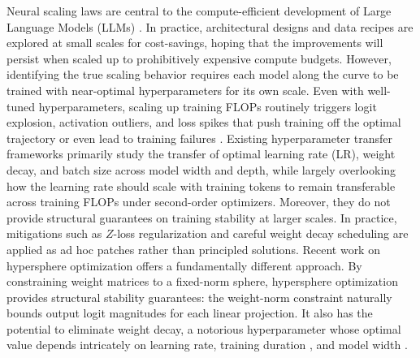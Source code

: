\documentclass{article}
\begin{document}
Neural scaling laws \cite{kaplan2020scaling, chinchilla, team2025every} are central to the compute-efficient development of Large Language Models (LLMs) \cite{gpt2, gpt3,openai2023gpt4, comanici2025gemini,deepseek-ai2024deepseekv3,team2025kimi,yang2025qwen3}. In practice, architectural designs and data recipes are explored at small scales for cost-savings, hoping that the improvements will persist when scaled up to prohibitively expensive compute budgets. However, identifying the true scaling behavior requires each model along the curve to be trained with near-optimal hyperparameters for its own scale. Even with well-tuned hyperparameters, scaling up training FLOPs routinely triggers logit explosion, activation outliers, and loss spikes \cite{zoph2022st0moe0, dettmers2022llm0int8000, chowdhery2023palm, qiu2025gated, qiu2026unified} that push training off the optimal trajectory or even lead to training failures \cite{zhang2022opt0, ren2025decoderhybriddecoder}. Existing hyperparameter transfer frameworks \cite{yang2022tensor, yang2023tensor, bjorck2025scaling, li2025predictable, chen2025how, mlodozeniec2025completedhyperparametertransfermodules} primarily study the transfer of optimal learning rate (LR), weight decay, and batch size across model width and depth, while largely overlooking how the learning rate should scale with training tokens to remain transferable across training FLOPs under second-order optimizers. Moreover, they do not provide structural guarantees on training stability at larger scales. In practice, mitigations such as $Z$-loss regularization \cite{zoph2022st0moe0} and careful weight decay scheduling \cite{defazio2025gradients} are applied as ad hoc patches rather than principled solutions. Recent work on hypersphere optimization \cite{bernstein2025manifolds, wen2025hyperball_part1, xie2026controlled} offers a fundamentally different approach. By constraining weight matrices to a fixed-norm sphere, hypersphere optimization provides structural stability guarantees: the weight-norm constraint naturally bounds output logit magnitudes for each linear projection. It also has the potential to eliminate weight decay, a notorious hyperparameter whose optimal value depends intricately on learning rate, training duration \cite{wang2024set, bergsma2025power}, and model width \cite{chen2025how}.
\end{document}
